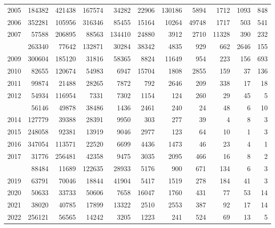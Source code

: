 \documentclass[
]{article}
\begin{document}
\begin{longtable}[t]{lrrrrrrrrrr}
2005 & 184382 & 421438 & 167574 & 34282 & 22906 & 130186 & 5894 & 1712 & 1093 & 848\\
2006 & 352281 & 105956 & 316346 & 85455 & 15164 & 10264 & 49748 & 1717 & 503 & 541\\
2007 & 57588 & 206895 & 88563 & 134410 & 24880 & 3912 & 2710 & 11328 & 390 & 232\\
\addlinespace
2008 & 263340 & 77642 & 132871 & 30284 & 38342 & 4835 & 929 & 662 & 2646 & 155\\
2009 & 300604 & 185120 & 31816 & 58365 & 8824 & 11649 & 954 & 223 & 156 & 693\\
2010 & 82655 & 120674 & 54983 & 6947 & 15704 & 1808 & 2855 & 159 & 37 & 136\\
2011 & 99874 & 21488 & 28265 & 7872 & 792 & 2646 & 209 & 338 & 17 & 18\\
2012 & 54934 & 116954 & 7331 & 7302 & 1154 & 124 & 260 & 29 & 45 & 5\\
\addlinespace
2013 & 56146 & 49878 & 38486 & 1436 & 2461 & 240 & 24 & 48 & 6 & 10\\
2014 & 127779 & 39388 & 28391 & 9950 & 303 & 277 & 39 & 4 & 8 & 3\\
2015 & 248058 & 92381 & 13919 & 9046 & 2977 & 123 & 64 & 10 & 1 & 3\\
2016 & 347054 & 113571 & 22520 & 6699 & 4436 & 1473 & 46 & 23 & 4 & 1\\
2017 & 31776 & 256481 & 42358 & 9475 & 3035 & 2095 & 466 & 16 & 8 & 2\\
\addlinespace
2018 & 88484 & 11689 & 122635 & 28933 & 5176 & 900 & 671 & 134 & 6 & 3\\
2019 & 63791 & 70046 & 18844 & 41904 & 5417 & 1519 & 278 & 184 & 41 & 3\\
2020 & 50633 & 33733 & 50606 & 7658 & 16047 & 1760 & 431 & 77 & 53 & 14\\
2021 & 38020 & 40785 & 17899 & 13322 & 2510 & 2553 & 387 & 92 & 17 & 14\\
2022 & 256121 & 56565 & 14242 & 3205 & 1223 & 241 & 524 & 69 & 13 & 5\\*
\end{longtable}
\end{document}
